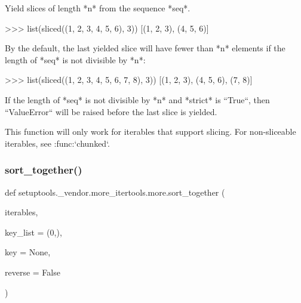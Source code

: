 \begin{DoxyVerb}Yield slices of length *n* from the sequence *seq*.

>>> list(sliced((1, 2, 3, 4, 5, 6), 3))
[(1, 2, 3), (4, 5, 6)]

By the default, the last yielded slice will have fewer than *n* elements
if the length of *seq* is not divisible by *n*:

>>> list(sliced((1, 2, 3, 4, 5, 6, 7, 8), 3))
[(1, 2, 3), (4, 5, 6), (7, 8)]

If the length of *seq* is not divisible by *n* and *strict* is
``True``, then ``ValueError`` will be raised before the last
slice is yielded.

This function will only work for iterables that support slicing.
For non-sliceable iterables, see :func:`chunked`.\end{DoxyVerb}
 \mbox{\label{namespacesetuptools_1_1__vendor_1_1more__itertools_1_1more_afc1ec28544ee515336f9adb89ddd1652}} 
\subsubsection{\texorpdfstring{sort\+\_\+together()}{sort\_together()}}
{\footnotesize\ttfamily def setuptools.\+\_\+vendor.\+more\+\_\+itertools.\+more.\+sort\+\_\+together (\begin{DoxyParamCaption}\item[{}]{iterables,  }\item[{}]{key\+\_\+list = {\ttfamily (0,)},  }\item[{}]{key = {\ttfamily None},  }\item[{}]{reverse = {\ttfamily False} }\end{DoxyParamCaption})}

